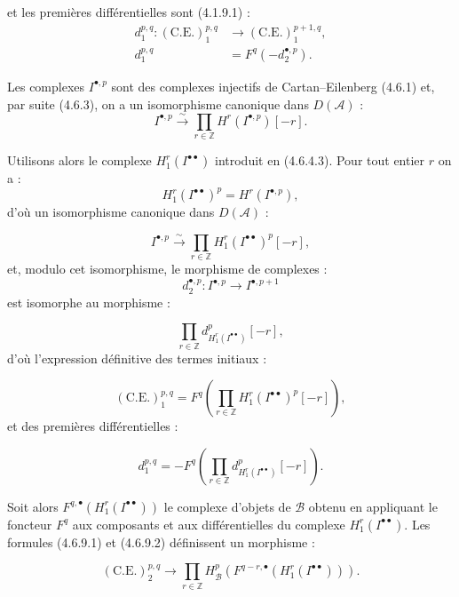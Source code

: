\clearpage
{}%
\begingroup\small\setlength{\parskip}{0pt}\setlength{\emergencystretch}{1.5em}
\setlength{\abovedisplayskip}{4pt plus 2pt minus 2pt}%
\setlength{\belowdisplayskip}{4pt plus 2pt minus 2pt}%

\noindent et les premières différentielles sont (4.1.9.1) :
\[
\begin{aligned}
d_1^{p,q}\colon(\mathrm{C.E.})_1^{p,q}
  &\longrightarrow(\mathrm{C.E.})_1^{p+1,q},\\
d_1^{p,q}&=F^q(-d_2^{\bullet,p}).
\end{aligned}
\]

Les complexes $I^{\bullet,p}$ sont des complexes injectifs de
Cartan--Eilenberg (4.6.1) et, par suite (4.6.3), on a un isomorphisme
canonique dans $D(\mathcal A)$ :
\[
I^{\bullet,p}\xrightarrow{\sim}
\prod_{r\in\mathbb Z}H^r(I^{\bullet,p})[-r].
\]

Utilisons alors le complexe $H_1^r(I^{\bullet\bullet})$ introduit en
(4.6.4.3). Pour tout entier $r$ on a :
\[
H_1^r(I^{\bullet\bullet})^p=H^r(I^{\bullet,p}),
\]
d'où un isomorphisme canonique dans $D(\mathcal A)$ :

\[
I^{\bullet,p}\xrightarrow{\sim}
\prod_{r\in\mathbb Z}H_1^r(I^{\bullet\bullet})^p[-r],
\]
et, modulo cet isomorphisme, le morphisme de complexes :
\[
d_2^{\bullet,p}\colon
I^{\bullet,p}\longrightarrow I^{\bullet,p+1}
\]
est isomorphe au morphisme :

\[
\prod_{r\in\mathbb Z}
d_{H_1^r(I^{\bullet\bullet})}^{p}[-r],
\]
d'où l'expression définitive des termes initiaux :

\[
(\mathrm{C.E.})_1^{p,q}
=F^q\left(
\prod_{r\in\mathbb Z}H_1^r(I^{\bullet\bullet})^p[-r]
\right),
\tag{4.6.9.1}
\]
et des premières différentielles :

\[
d_1^{p,q}
=-F^q\left(
\prod_{r\in\mathbb Z}d_{H_1^r(I^{\bullet\bullet})}^{p}[-r]
\right).
\tag{4.6.9.2}
\]

Soit alors $F^{q,\bullet}(H_1^r(I^{\bullet\bullet}))$ le complexe d'objets
de $\mathcal B$ obtenu en appliquant le foncteur $F^q$ aux composants et
aux différentielles du complexe $H_1^r(I^{\bullet\bullet})$. Les formules
(4.6.9.1) et (4.6.9.2) définissent un morphisme :

\[
(\mathrm{C.E.})_2^{p,q}\longrightarrow
\prod_{r\in\mathbb Z}
H_{\mathcal B}^{p}\left(
F^{q-r,\bullet}(H_1^r(I^{\bullet\bullet}))
\right).
\tag{4.6.9.3}
\]
\endgroup
